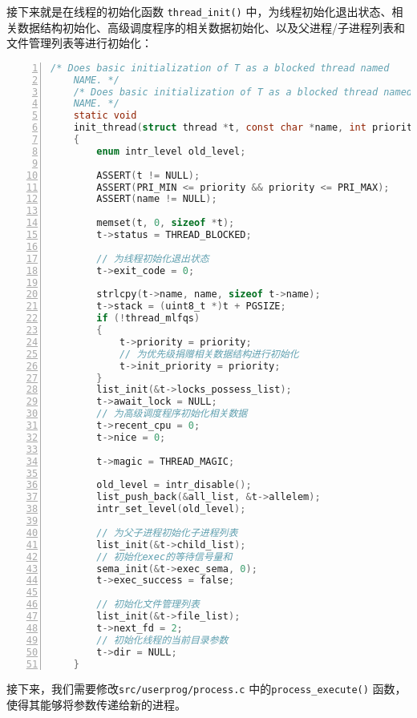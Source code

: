 \documentclass{article}
\begin{document}
	接下来就是在线程的初始化函数 \texttt{thread\_init()} 中，为线程初始化退出状态、相关数据结构初始化、高级调度程序的相关数据初始化、以及父进程/子进程列表和文件管理列表等进行初始化：
	
	\begin{lstlisting}[xleftmargin = 4em,xrightmargin = 4em, aboveskip = 1em, numbers = left, language = C,title=src/threads/thread.c中初始化函数]
    /* Does basic initialization of T as a blocked thread named
    NAME. */
    /* Does basic initialization of T as a blocked thread named
    NAME. */
    static void
    init_thread(struct thread *t, const char *name, int priority)
    {
    	enum intr_level old_level;
    	
    	ASSERT(t != NULL);
    	ASSERT(PRI_MIN <= priority && priority <= PRI_MAX);
    	ASSERT(name != NULL);
    	
    	memset(t, 0, sizeof *t);
    	t->status = THREAD_BLOCKED;
    	
    	// 为线程初始化退出状态
    	t->exit_code = 0;
    	
    	strlcpy(t->name, name, sizeof t->name);
    	t->stack = (uint8_t *)t + PGSIZE;
    	if (!thread_mlfqs)
    	{
    		t->priority = priority;
    		// 为优先级捐赠相关数据结构进行初始化
    		t->init_priority = priority;
    	}
    	list_init(&t->locks_possess_list);
    	t->await_lock = NULL;
    	// 为高级调度程序初始化相关数据
    	t->recent_cpu = 0;
    	t->nice = 0;
    	
    	t->magic = THREAD_MAGIC;
    	
    	old_level = intr_disable();
    	list_push_back(&all_list, &t->allelem);
    	intr_set_level(old_level);
    	
    	// 为父子进程初始化子进程列表
    	list_init(&t->child_list);
    	// 初始化exec的等待信号量和
    	sema_init(&t->exec_sema, 0);
    	t->exec_success = false;
    	
    	// 初始化文件管理列表
    	list_init(&t->file_list);
    	t->next_fd = 2;
    	// 初始化线程的当前目录参数
    	t->dir = NULL;
    }
	\end{lstlisting}
	
	接下来，我们需要修改\texttt{src/userprog/process.c} 中的\texttt{process\_execute()} 函数，使得其能够将参数传递给新的进程。
	
\end{document}
